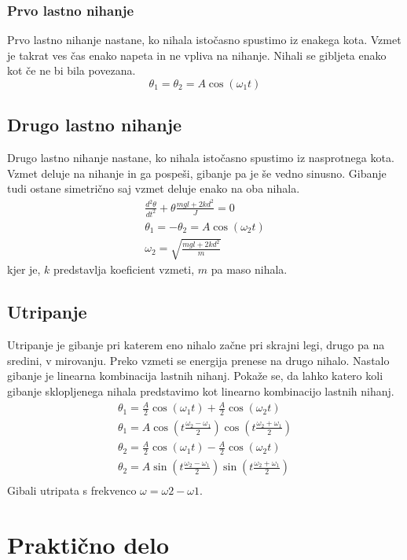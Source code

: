 \documentclass[a4paper]{article}
\begin{document}
\subsubsection{Prvo lastno nihanje}
Prvo lastno nihanje nastane, ko nihala istočasno spustimo iz enakega kota. Vzmet je takrat ves čas enako napeta in ne vpliva na nihanje. Nihali se gibljeta enako kot če ne bi bila povezana.
\[
\theta_1 = \theta_2 = A\cos(\omega_1 t)
\]

\subsection{Drugo lastno nihanje}
Drugo lastno nihanje nastane, ko nihala istočasno spustimo iz nasprotnega kota. Vzmet deluje na nihanje in ga pospeši, gibanje pa je še vedno sinusno. Gibanje tudi ostane simetrično saj vzmet deluje enako na oba nihala.
\begin{align*}
  \frac{d^2\theta}{dt^2} +\theta \frac{mgl+2kd^2}{J} = 0\\ %
  \theta_1 = -\theta_2 = A\cos(\omega_2 t)\\
  \omega_2 = \sqrt{\frac{mgl+2kd^2}{m}}
\end{align*}
kjer je, $k$ predstavlja koeficient vzmeti, $m$ pa maso nihala.
\subsection{Utripanje}
Utripanje je gibanje pri katerem eno nihalo začne pri skrajni legi, drugo pa na sredini, v mirovanju. Preko vzmeti se energija prenese na drugo nihalo. Nastalo gibanje je linearna kombinacija lastnih nihanj. Pokaže se, da lahko katero koli gibanje sklopljenega nihala predstavimo kot linearno kombinacijo lastnih nihanj.
\begin{align*}
  \theta_1 = \frac A 2\cos(\omega_1t)+\frac A 2 \cos(\omega_2t)\\
  \theta_1 = A \cos\left(t\frac{\omega_2-\omega_1}{2}\right)\cos\left(t\frac{\omega_2+\omega_1}{2}\right)\\
  \theta_2 = \frac A 2\cos(\omega_1t)-\frac A 2 \cos(\omega_2t)\\
  \theta_2 = A \sin\left(t\frac{\omega_2-\omega_1}{2}\right)\sin\left(t\frac{\omega_2+\omega_1}{2}\right)\\ 
\end{align*}
Gibali utripata s frekvenco \(\omega = \omega2-\omega1\).
\section{Praktično delo}
\end{document}
